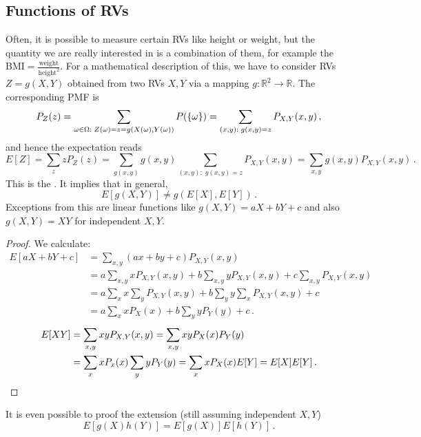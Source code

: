 	\subsection{Functions of RVs}
Often, it is possible to measure certain RVs like height or weight, but the quantity we are really interested in is a combination of them, for example the $\text{BMI} = \frac{\text{weight}}{\text{height}^2}$. For a mathematical description of this, we have to consider RVs $Z = g(X, Y)$ obtained from two RVs $X, Y$ via a mapping $g: \mathbb{R}^2 \rightarrow \mathbb{R}$. The corresponding PMF is
\begin{equation}
P_Z(z) = \sum_{\omega \in \Omega: \; Z(\omega) = z = g\qty(X(\omega), Y(\omega))} P(\qty{\omega}) = \sum_{(x, y): \; g(x, y) = z} P_{X, Y}(x, y) \, ,
\end{equation}
and hence the expectation reads
\begin{equation}
E[Z] = \sum_z z P_Z(z) = \sum_{g(x, y)} g(x, y) \sum_{(x, y): \; g(x, y) = z} P_{X, Y}(x, y) = \sum_{x, y} g(x, y) P_{X, Y}(x, y) \, .
\end{equation}
This is the . It implies that in general,
\begin{equation}
E[g(X, Y)] \neq g(E[X], E[Y]) \, .
\end{equation}
Exceptions from this are linear functions like $g(X, Y) = a X + b Y + c$ and also $g(X, Y) = X Y$ for independent $X, Y$.

\begin{proof}
We calculate:
\begin{align*}
E[a X + b Y + c] &= \sum_{x, y} (a x + b y + c) P_{X, Y}(x, y)
\\
&= a \sum_{x, y} x P_{X, Y}(x, y) + b \sum_{x, y} y P_{X, Y}(x, y) + c \sum_{x, y} P_{X, Y}(x, y)
\\
&= a \sum_x x \sum_y P_{X, Y}(x, y) + b \sum_y y \sum_x P_{X, Y}(x, y) + c
\\
&= a \sum_x x P_X(x) + b \sum_y y P_Y(y) + c \, .
\end{align*}
%
\begin{align*}
E[X Y] &= \sum_{x, y} x y P_{X, Y}(x, y) = \sum_{x, y} x y P_X(x) P_Y(y) 
\\
&= \sum_x x P_x(x) \sum_y y P_Y(y) = \sum_x x P_X(x) E[Y] = E[X] E[Y] \, .\qedhere
\end{align*}
\end{proof}

It is even possible to proof the extension (still assuming independent $X, Y$)
\begin{equation}
E[g(X) h(Y)] = E[g(X)] E[h(Y)] \,. 
\end{equation}


